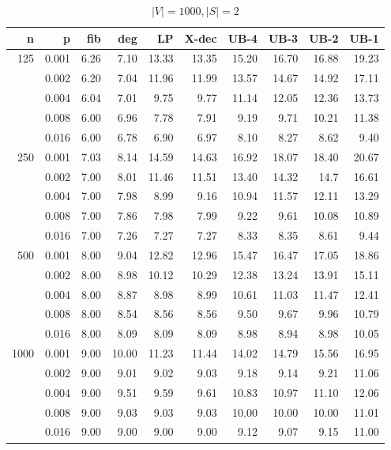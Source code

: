\begin{table}[]
\centering
\begin{tabular}{rrrrrrrrrr}
n     &	p & fib  & deg  & LP    & X-dec & UB-4  & UB-3  & UB-2  & UB-1  \\
\hline
\multirow{5}{*}{125} 
& 0.001 & 6.26 & 7.10 & 13.33 & 13.35 & 15.20 & 16.70 & 16.88 & 19.23 \\
& 0.002 & 6.20 & 7.04 & 11.96 & 11.99 & 13.57 & 14.67 & 14.92 & 17.11 \\
& 0.004 & 6.04 & 7.01 & 9.75  & 9.77  & 11.14 & 12.05 & 12.36 & 13.73 \\
& 0.008 & 6.00 & 6.96 & 7.78  & 7.91  & 9.19  & 9.71  & 10.21 & 11.38 \\
& 0.016 & 6.00 & 6.78 & 6.90  & 6.97  & 8.10  & 8.27  & 8.62  & 9.40  \\
\hline
\multirow{5}{*}{250} 
& 0.001 & 7.03 & 8.14 & 14.59 & 14.63 & 16.92 & 18.07 & 18.40 & 20.67 \\
& 0.002 & 7.00 & 8.01 & 11.46 & 11.51 & 13.40 & 14.32 & 14.7  & 16.61 \\
& 0.004 & 7.00 & 7.98 & 8.99  & 9.16  & 10.94 & 11.57 & 12.11 & 13.29 \\
& 0.008 & 7.00 & 7.86 & 7.98  & 7.99  & 9.22  & 9.61  & 10.08 & 10.89 \\
& 0.016 & 7.00 & 7.26 & 7.27  & 7.27  & 8.33  & 8.35  & 8.61  & 9.44  \\
\hline
\multirow{5}{*}{500} 
& 0.001 & 8.00 & 9.04 & 12.82 &12.96  &15.47  & 16.47 & 17.05 & 18.86 \\
& 0.002 & 8.00 & 8.98 & 10.12 &10.29  &12.38  & 13.24 & 13.91 & 15.11 \\
& 0.004 & 8.00 & 8.87 & 8.98  &8.99   &10.61  & 11.03 & 11.47 & 12.41 \\
& 0.008 & 8.00 & 8.54 & 8.56  &8.56   &9.50   & 9.67  & 9.96  & 10.79 \\
& 0.016 & 8.00 & 8.09 & 8.09  &8.09   &8.98   & 8.94  & 8.98  & 10.05 \\
\hline
\multirow{5}{*}{1000} 
& 0.001 & 9.00 & 10.00 & 11.23 & 11.44 & 14.02 & 14.79 & 15.56 & 16.95 \\
& 0.002 & 9.00 & 9.01  & 9.02  & 9.03  & 9.18  & 9.14  & 9.21  & 11.06 \\
& 0.004 & 9.00 & 9.51  & 9.59  & 9.61  & 10.83 & 10.97 & 11.10 & 12.06 \\
& 0.008 & 9.00 & 9.03  & 9.03  & 9.03  & 10.00 & 10.00 & 10.00 & 11.01 \\
& 0.016 & 9.00 & 9.00  & 9.00  & 9.00  & 9.12  & 9.07  & 9.15  & 11.00 \\
\end{tabular}
\caption{$|V|=1000, |S|=2$}
\label{tab:obj-s2}
\end{table}



